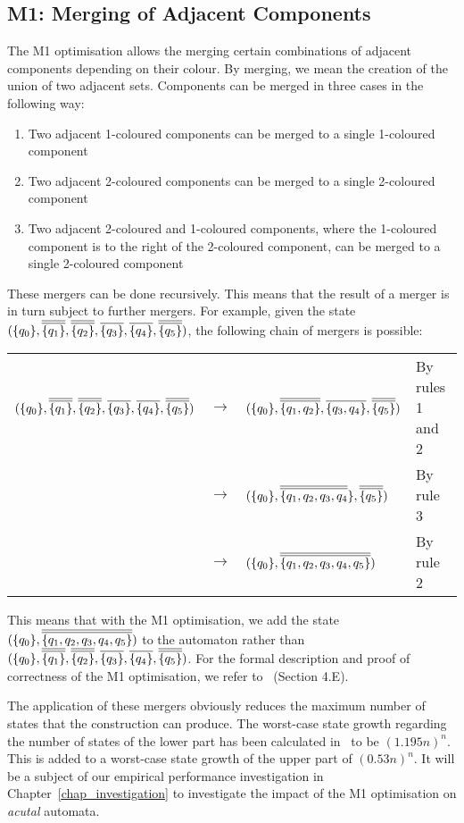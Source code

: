 \subsection{M1: Merging of Adjacent Components}
The M1 optimisation allows the merging certain combinations of adjacent components depending on their colour. By merging, we mean the creation of the union of two adjacent sets. Components can be merged in three cases in the following way:

\begin{enumerate}
\item Two adjacent 1-coloured components can be merged to a single 1-coloured component
\item Two adjacent 2-coloured components can be merged to a single 2-coloured component
\item Two adjacent 2-coloured and 1-coloured components, where the 1-coloured component is to the right of the 2-coloured component, can be merged to a single 2-coloured component
\end{enumerate}

These mergers can be done recursively. This means that the result of a merger is in turn subject to further mergers. For example, given the state $(\qm0, \cl2{\qm1}, \cl2{\qm2}, \cl1{\qm3}, \cl1{\qm4}, \cl2{\qm5})$, the following chain of mergers is possible:

{\renewcommand{\arraystretch}{1.7}
\begin{tabular}{llll}
$(\qm0, \cl2{\qm1}, \cl2{\qm2}, \cl1{\qm3}, \cl1{\qm4}, \cl2{\qm5})$ & $\longrightarrow$ & $(\qm0, \cl2{\{q_1,q_2\}}, \cl1{\{q_3,q_4\}}, \cl2{\qm5})$ &
By rules 1 and 2 \\
& $\longrightarrow$  & $(\qm0, \cl2{\{q_1,q_2,q_3,q_4}\}, \cl2{\qm5})$ &
By rule 3 \\
& $\longrightarrow$ & $(\qm0, \cl2{\{q_1, q_2, q_3, q_4, q_5\}})$ &
By rule 2
\end{tabular}}

This means that with the M1 optimisation, we add the state $(\qm0, \cl2{\{q_1, q_2, q_3, q_4, q_5\}})$ to the automaton rather than $(\qm0, \cl2{\qm1}, \cl2{\qm2}, \cl1{\qm3}, \cl1{\qm4}, \cl2{\qm5})$. For the formal description and proof of correctness of the M1 optimisation, we refer to~\cite{2014_joel_ulrich} (Section 4.E).

The application of these mergers obviously reduces the maximum number of states that the construction can produce. The worst-case state growth regarding the number of states of the lower part has been calculated in~\cite{2014_joel_ulrich} to be $(1.195n)^n$. This is added to a worst-case state growth of the upper part of $(0.53n)^n$. It will be a subject of our empirical performance investigation in Chapter~\ref{chap_investigation} to investigate the impact of the M1 optimisation on \textit{acutal} automata.



